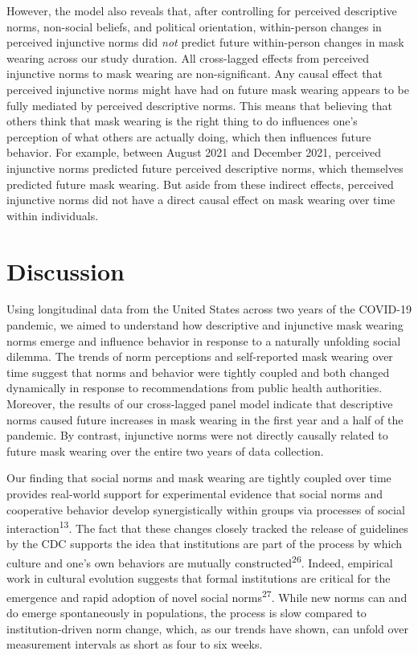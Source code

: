 \documentclass[
  man, donotrepeattitle,floatsintext]{apa6}
\begin{document}
However, the model also reveals that, after controlling for perceived descriptive norms, non-social beliefs, and political orientation, within-person changes in perceived injunctive norms did \emph{not} predict future within-person changes in mask wearing across our study duration. All cross-lagged effects from perceived injunctive norms to mask wearing are non-significant. Any causal effect that perceived injunctive norms might have had on future mask wearing appears to be fully mediated by perceived descriptive norms. This means that believing that others think that mask wearing is the right thing to do influences one's perception of what others are actually doing, which then influences future behavior. For example, between August 2021 and December 2021, perceived injunctive norms predicted future perceived descriptive norms, which themselves predicted future mask wearing. But aside from these indirect effects, perceived injunctive norms did not have a direct causal effect on mask wearing over time within individuals.

\hypertarget{discussion}{%
\section{Discussion}\label{discussion}}

Using longitudinal data from the United States across two years of the COVID-19 pandemic, we aimed to understand how descriptive and injunctive mask wearing norms emerge and influence behavior in response to a naturally unfolding social dilemma. The trends of norm perceptions and self-reported mask wearing over time suggest that norms and behavior were tightly coupled and both changed dynamically in response to recommendations from public health authorities. Moreover, the results of our cross-lagged panel model indicate that descriptive norms caused future increases in mask wearing in the first year and a half of the pandemic. By contrast, injunctive norms were not directly causally related to future mask wearing over the entire two years of data collection.

Our finding that social norms and mask wearing are tightly coupled over time provides real-world support for experimental evidence that social norms and cooperative behavior develop synergistically within groups via processes of social interaction\textsuperscript{13}. The fact that these changes closely tracked the release of guidelines by the CDC supports the idea that institutions are part of the process by which culture and one's own behaviors are mutually constructed\textsuperscript{26}. Indeed, empirical work in cultural evolution suggests that formal institutions are critical for the emergence and rapid adoption of novel social norms\textsuperscript{27}. While new norms can and do emerge spontaneously in populations, the process is slow compared to institution-driven norm change, which, as our trends have shown, can unfold over measurement intervals as short as four to six weeks.
\end{document}
